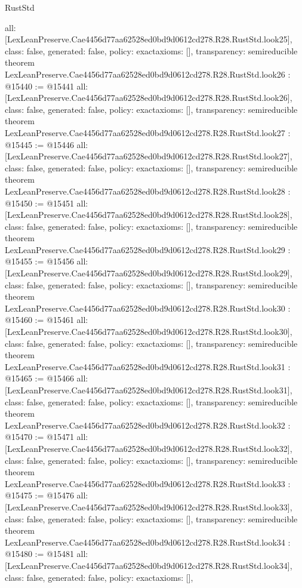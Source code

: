 \begin{lexlean}{RustStd}
\begin{coremodule}
{  all: [LexLeanPreserve.Cae4456d77aa62528ed0bd9d0612cd278.R28.RustStd.look25],
  class: false,
  generated: false,
  policy: exact{axioms: []},
  transparency: semireducible
}
theorem LexLeanPreserve.Cae4456d77aa62528ed0bd9d0612cd278.R28.RustStd.look26 : @15440 := @15441 {
  all: [LexLeanPreserve.Cae4456d77aa62528ed0bd9d0612cd278.R28.RustStd.look26],
  class: false,
  generated: false,
  policy: exact{axioms: []},
  transparency: semireducible
}
theorem LexLeanPreserve.Cae4456d77aa62528ed0bd9d0612cd278.R28.RustStd.look27 : @15445 := @15446 {
  all: [LexLeanPreserve.Cae4456d77aa62528ed0bd9d0612cd278.R28.RustStd.look27],
  class: false,
  generated: false,
  policy: exact{axioms: []},
  transparency: semireducible
}
theorem LexLeanPreserve.Cae4456d77aa62528ed0bd9d0612cd278.R28.RustStd.look28 : @15450 := @15451 {
  all: [LexLeanPreserve.Cae4456d77aa62528ed0bd9d0612cd278.R28.RustStd.look28],
  class: false,
  generated: false,
  policy: exact{axioms: []},
  transparency: semireducible
}
theorem LexLeanPreserve.Cae4456d77aa62528ed0bd9d0612cd278.R28.RustStd.look29 : @15455 := @15456 {
  all: [LexLeanPreserve.Cae4456d77aa62528ed0bd9d0612cd278.R28.RustStd.look29],
  class: false,
  generated: false,
  policy: exact{axioms: []},
  transparency: semireducible
}
theorem LexLeanPreserve.Cae4456d77aa62528ed0bd9d0612cd278.R28.RustStd.look30 : @15460 := @15461 {
  all: [LexLeanPreserve.Cae4456d77aa62528ed0bd9d0612cd278.R28.RustStd.look30],
  class: false,
  generated: false,
  policy: exact{axioms: []},
  transparency: semireducible
}
theorem LexLeanPreserve.Cae4456d77aa62528ed0bd9d0612cd278.R28.RustStd.look31 : @15465 := @15466 {
  all: [LexLeanPreserve.Cae4456d77aa62528ed0bd9d0612cd278.R28.RustStd.look31],
  class: false,
  generated: false,
  policy: exact{axioms: []},
  transparency: semireducible
}
theorem LexLeanPreserve.Cae4456d77aa62528ed0bd9d0612cd278.R28.RustStd.look32 : @15470 := @15471 {
  all: [LexLeanPreserve.Cae4456d77aa62528ed0bd9d0612cd278.R28.RustStd.look32],
  class: false,
  generated: false,
  policy: exact{axioms: []},
  transparency: semireducible
}
theorem LexLeanPreserve.Cae4456d77aa62528ed0bd9d0612cd278.R28.RustStd.look33 : @15475 := @15476 {
  all: [LexLeanPreserve.Cae4456d77aa62528ed0bd9d0612cd278.R28.RustStd.look33],
  class: false,
  generated: false,
  policy: exact{axioms: []},
  transparency: semireducible
}
theorem LexLeanPreserve.Cae4456d77aa62528ed0bd9d0612cd278.R28.RustStd.look34 : @15480 := @15481 {
  all: [LexLeanPreserve.Cae4456d77aa62528ed0bd9d0612cd278.R28.RustStd.look34],
  class: false,
  generated: false,
  policy: exact{axioms: []},
}
\end{coremodule}
\end{lexlean}
